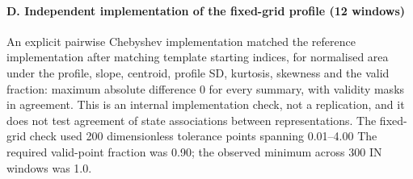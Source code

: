 \documentclass[10pt]{article}
\begin{document}
\paragraph{D. Independent implementation of the fixed-grid profile (12 windows)}
An explicit pairwise Chebyshev implementation matched the reference implementation after matching template starting indices, for normalised area under the profile, slope, centroid, profile SD, kurtosis, skewness and the valid fraction: maximum absolute difference 0 for every summary, with validity masks in agreement. This is an internal implementation check, not a replication, and it does not test agreement of state associations between representations. The fixed-grid check used 200 dimensionless tolerance points spanning 0.01--4.00 The required valid-point fraction was 0.90; the observed minimum across 300 IN windows was 1.0.
\end{document}
